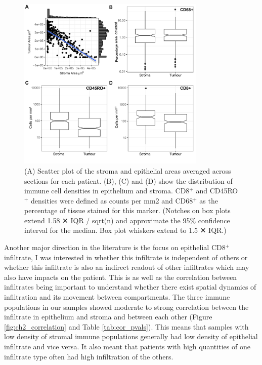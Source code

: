 \begin{figure}
    \centering
    \includegraphics[width=0.8\textwidth]{Chapter2/Figs/Raster/plots_dist.png}
    \caption[Distribution of immune densities.]{ (A) Scatter plot of the stroma and epithelial  areas averaged across sections for each patient. (B), (C) and (D) show the distribution of immune cell densities in epithelium and stroma. CD8$^+$ and CD45RO$^+$ densities were defined as counts per mm2 and CD68$^+$ as the percentage of tissue stained for this marker. (Notches on box plots extend 1.58 ✕ IQR / sqrt(n) and approximate the 95\% confidence interval for the median. Box plot whiskers extend to 1.5 ✕ IQR.) 
}
    \label{fig:distribution_infiltrate}
\end{figure}

Another major direction in the literature is the focus on epithelial CD8$^+$ infiltrate, I was interested in whether this infiltrate is independent of others or whether this infiltrate is also an indirect readout of other infiltrates which may also have impacts on the patient. This is as well as the correlation between infiltrates being important to understand whether there exist spatial dynamics of infiltration and its movement between compartments. The three immune populations in our samples showed moderate to strong correlation between the infiltrate in epithelium and stroma and between each other (Figure \ref{fig:ch2_correlation} and Table \ref{tab:cor_pvals}). This means that samples with low density of stromal immune populations generally had low density of epithelial infiltrate and vice versa. It also meant that patients with high quantities of one infiltrate type often had high infiltration of the others.

